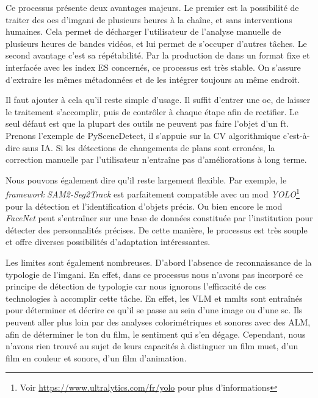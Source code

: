 Ce processus présente deux avantages majeurs. Le premier est la possibilité de traiter des \glspl{oe} d'\gls{imgani} de plusieurs heures à la chaîne, et sans interventions humaines. Cela permet de décharger l'utilisateur de l'analyse manuelle de plusieurs heures de bandes vidéos, et lui permet de s'occuper d'autres tâches. Le second avantage c'est sa répétabilité. Par la production de \J dans un format fixe et interfacée avec les index \gls{ES} concernés, ce processus est très stable. On s'assure d'extraire les mêmes métadonnées et de les intégrer toujours au même endroit. 

Il faut ajouter à cela qu'il reste simple d'usage. Il suffit d'entrer une \gls{oe}, de laisser le traitement s'accomplir, puis de contrôler à chaque étape afin de rectifier. Le seul défaut est que la plupart des outils ne peuvent pas faire l'objet d'un \gls{ft}. Prenons l'exemple de PySceneDetect, il s’appuie sur la \gls{CV} algorithmique c'est-à-dire sans \gls{IA}. Si les détections de changements de plans sont erronées, la correction manuelle par l'utilisateur n'entraîne pas d'améliorations à long terme.

Nous pouvons également dire qu'il reste largement flexible. Par exemple, le \textit{framework} \textit{SAM2-Seg2Track} est parfaitement compatible avec un \gls{mod} \textit{YOLO}\footnote{Voir \url{https://www.ultralytics.com/fr/yolo} pour plus d'informations} pour la détection et l'identification d'objets précis. Ou bien encore le \gls{mod} \textit{FaceNet} peut s'entraîner sur une base de données constituée par l'institution pour détecter des personnalités précises. De cette manière, le processus est très souple et offre diverses possibilités d'adaptation intéressantes.\newline

Les limites sont également nombreuses. D'abord l'absence de reconnaissance de la typologie de l'\gls{imgani}. En effet, dans ce processus nous n'avons pas incorporé ce principe de détection de typologie car nous ignorons l'efficacité de ces technologies à accomplir cette tâche. En effet, les \gls{VLM} et \gls{mmlts} sont entraînés pour déterminer et décrire ce qu'il se passe au sein d'une image ou d'une \gls{sc}. Ils peuvent aller plus loin par des analyses colorimétriques et sonores avec des \gls{ALM}, afin de déterminer le ton du film, le sentiment qui s'en dégage. Cependant, nous n'avons rien trouvé au sujet de leurs capacités à distinguer un film muet, d'un film en couleur et sonore, d'un film d'animation. 

